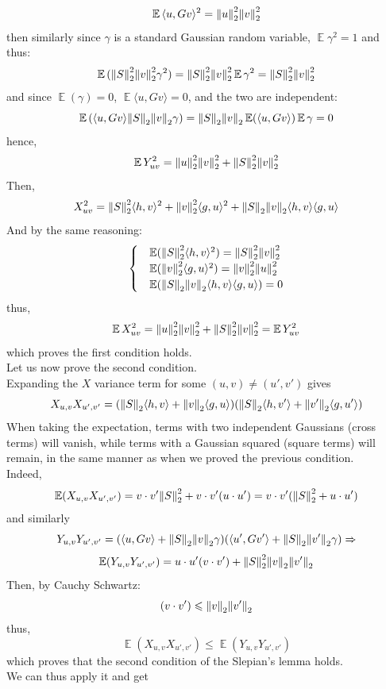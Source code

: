 \documentclass[12pt,letterpaper]{article}
\renewcommand{\le}{\leqslant}
\newcommand{\snorm}[1]{\norm{#1}_2}
\newcommand{\snormsq}[1]{\snorm{#1}^2}
\newcommand{\Expect}{\operatorname{\mathbb{E}}}
\begin{document}
\begin{enumerate}
$$
\Expect{\langle u,Gv\rangle^2} = \snormsq{u}\snormsq{v}
$$
then similarly since $\gamma$ is a standard Gaussian random variable, $\Expect{\gamma^2}=1$ and thus:
$$
\Expect{(\snorm{S}^2\snorm{v}^2\gamma^2)} = \snorm{S}^2\snorm{v}^2\Expect{\gamma^2} = \snorm{S}^2\snorm{v}^2
$$
and since $\Expect(\gamma) = 0$, $\Expect{\langle u,Gv\rangle} = 0$, and the two are independent:
$$
\Expect{(\langle u,Gv\rangle \snorm{S}\snorm{v}\gamma )} = \snorm{S}\snorm{v}\Expect (\langle u,Gv\rangle) \Expect \gamma = 0
$$
hence,
$$
\Expect Y_{uv}^2 = \snormsq{u}\snormsq{v} + \snorm{S}^2\snorm{v}^2
$$
Then,
$$
X_{uv}^2 = \snorm{S}^2 \langle h,v \rangle^2 + \snorm{v}^2\langle g,u\rangle^2 +\snorm{S}\snorm{v}\langle h,v \rangle \langle g,u\rangle
$$
And by the same reasoning:
$$
\begin{cases}
    &\Expect(\snorm{S}^2 \langle h,v \rangle^2 ) =
    \snorm{S}^2\snormsq{v}\\
    &\Expect(\snorm{v}^2\langle g,u\rangle^2 ) = 
    \snorm{v}^2\snormsq{u}\\
    &\Expect(\snorm{S}\snorm{v}\langle h,v \rangle \langle g,u\rangle) = 0\\
\end{cases}
$$
thus,
$$
\Expect X_{uv}^2 = \snormsq{u}\snormsq{v} + \snorm{S}^2\snorm{v}^2 = \Expect Y_{uv}^2 
$$
which proves the first condition holds.\\
Let us now prove the second condition.\\
Expanding the $X$ variance term for some $(u,v) \ne (u',v')$ gives
$$
X_{u,v}X_{u',v'} = (\snorm{S}\langle h,v \rangle + \snorm{v}\langle g,u\rangle)(\snorm{S}\langle h,v' \rangle + \snorm{v'}\langle g,u'\rangle)
$$
When taking the expectation, terms with two independent Gaussians (cross terms) will vanish, while terms with a Gaussian squared (square terms) will remain, in the same manner as when we proved the previous condition. \\
Indeed,
$$
\Expect(X_{u,v}X_{u',v'}) = v\cdot v'\snormsq{S}
+ v\cdot v'(u\cdot u') = v\cdot v'(\snormsq{S}+u\cdot u')
$$
and similarly
$$
Y_{u,v}Y_{u',v'} = (\langle u,Gv\rangle + \snorm{S}\snorm{v}\gamma)(\langle u',Gv'\rangle + \snorm{S}\snorm{v'}\gamma) \Rightarrow
$$
$$
\Expect(Y_{u,v}Y_{u',v'}) = 
u\cdot u'(v\cdot v')+\snormsq{S}\snorm{v}\snorm{v'}
$$
Then, by Cauchy Schwartz:
$$
(v\cdot v')\le 
\snorm{v}\snorm{v'}
$$
thus,
$$
\Expect(X_{u,v}X_{u',v'}) \le \Expect(Y_{u,v}Y_{u',v'})
$$
which proves that the second condition of the Slepian's lemma holds.\\
We can thus apply it and get

\end{enumerate}
\end{document}
